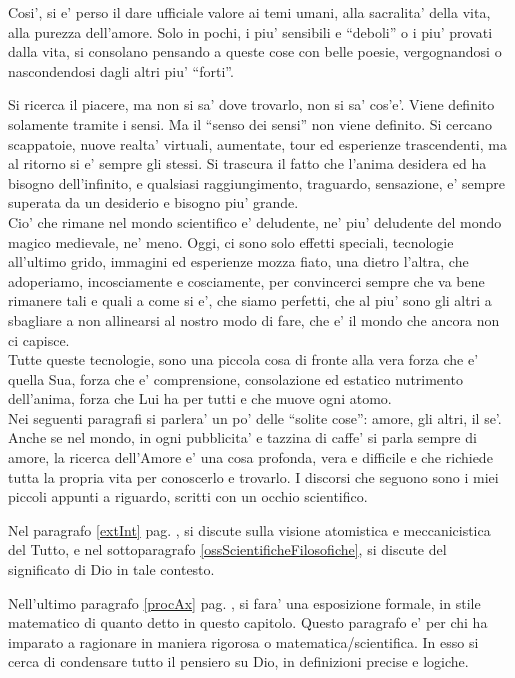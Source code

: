 Cosi', si e' perso il dare ufficiale valore ai temi umani, alla sacralita' della vita, alla purezza dell'amore. Solo in pochi, i piu' sensibili e ``deboli'' o i piu' provati dalla vita, si consolano pensando a queste cose con belle poesie, vergognandosi o nascondendosi dagli altri piu' ``forti''.

Si ricerca il piacere, ma non si sa' dove trovarlo, non si sa' cos'e'. Viene definito solamente tramite i sensi. Ma il ``senso dei sensi'' non viene definito. Si cercano scappatoie, nuove realta' virtuali, aumentate, tour ed esperienze trascendenti, ma al ritorno si e' sempre gli stessi. Si trascura il fatto che l'anima desidera ed ha bisogno dell'infinito, e qualsiasi raggiungimento, traguardo, sensazione, e' sempre superata da un desiderio e bisogno piu' grande.\\
Cio' che rimane nel mondo scientifico e' deludente, ne' piu' deludente del mondo magico medievale, ne' meno. Oggi, ci sono solo effetti speciali, tecnologie all'ultimo grido, immagini ed esperienze mozza fiato, una dietro l'altra, che adoperiamo, incosciamente e cosciamente, per convincerci sempre che va bene rimanere tali e quali a come si e', che siamo perfetti, che al piu' sono gli altri a sbagliare a non allinearsi al nostro modo di fare, che e' il mondo che ancora non ci capisce.\\
Tutte queste tecnologie, sono una piccola cosa di fronte alla vera forza che e' quella Sua, forza che e' comprensione, consolazione ed estatico nutrimento dell'anima, forza che Lui ha per tutti e che muove ogni atomo.\\

Nei seguenti paragrafi si parlera' un po' delle ``solite cose'': amore, gli altri, il se'. Anche se nel mondo, in ogni pubblicita' e tazzina di caffe' si parla sempre di amore, la ricerca dell'Amore e' una cosa profonda, vera e difficile e che richiede tutta la propria vita per conoscerlo e trovarlo. I discorsi che seguono sono i miei piccoli appunti a riguardo, scritti con un occhio scientifico.

Nel paragrafo \ref{extInt} pag. \pageref{extInt}, si discute sulla visione atomistica e meccanicistica del Tutto, e nel sottoparagrafo \ref{ossScientificheFilosofiche}, si discute del significato di Dio in tale contesto.

Nell'ultimo paragrafo \ref{procAx} pag. \pageref{procAx}, si fara' una esposizione formale, in stile matematico di quanto detto in questo capitolo. Questo paragrafo e' per chi ha imparato a ragionare in maniera rigorosa o matematica/scientifica. In esso si cerca di condensare tutto il pensiero su Dio, in definizioni precise e logiche.


